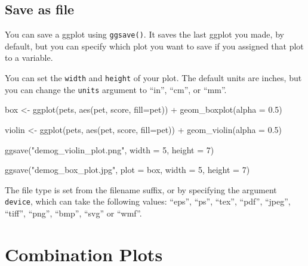 \documentclass[
  oneside]{book}
\newenvironment{Shaded}{\begin{snugshade}}{\end{snugshade}}
\newcommand{\AttributeTok}[1]{\textcolor[rgb]{0.77,0.63,0.00}{#1}}
\newcommand{\DecValTok}[1]{\textcolor[rgb]{0.00,0.00,0.81}{#1}}
\newcommand{\FloatTok}[1]{\textcolor[rgb]{0.00,0.00,0.81}{#1}}
\newcommand{\FunctionTok}[1]{\textcolor[rgb]{0.00,0.00,0.00}{#1}}
\newcommand{\NormalTok}[1]{#1}
\newcommand{\OtherTok}[1]{\textcolor[rgb]{0.56,0.35,0.01}{#1}}
\newcommand{\SpecialCharTok}[1]{\textcolor[rgb]{0.00,0.00,0.00}{#1}}
\newcommand{\StringTok}[1]{\textcolor[rgb]{0.31,0.60,0.02}{#1}}
\begin{document}
\hypertarget{ggsave}{%
\subsection{Save as file}\label{ggsave}}

You can save a ggplot using \texttt{ggsave()}. It saves the last ggplot you made, by default, but you can specify which plot you want to save if you assigned that plot to a variable.

You can set the \texttt{width} and \texttt{height} of your plot. The default units are inches, but you can change the \texttt{units} argument to ``in'', ``cm'', or ``mm''.

\begin{Shaded}
\begin{Highlighting}[]
\NormalTok{box }\OtherTok{\textless{}{-}} \FunctionTok{ggplot}\NormalTok{(pets, }\FunctionTok{aes}\NormalTok{(pet, score, }\AttributeTok{fill=}\NormalTok{pet)) }\SpecialCharTok{+}
  \FunctionTok{geom\_boxplot}\NormalTok{(}\AttributeTok{alpha =} \FloatTok{0.5}\NormalTok{)}

\NormalTok{violin }\OtherTok{\textless{}{-}} \FunctionTok{ggplot}\NormalTok{(pets, }\FunctionTok{aes}\NormalTok{(pet, score, }\AttributeTok{fill=}\NormalTok{pet)) }\SpecialCharTok{+}
  \FunctionTok{geom\_violin}\NormalTok{(}\AttributeTok{alpha =} \FloatTok{0.5}\NormalTok{)}

\FunctionTok{ggsave}\NormalTok{(}\StringTok{"demog\_violin\_plot.png"}\NormalTok{, }\AttributeTok{width =} \DecValTok{5}\NormalTok{, }\AttributeTok{height =} \DecValTok{7}\NormalTok{)}

\FunctionTok{ggsave}\NormalTok{(}\StringTok{"demog\_box\_plot.jpg"}\NormalTok{, }\AttributeTok{plot =}\NormalTok{ box, }\AttributeTok{width =} \DecValTok{5}\NormalTok{, }\AttributeTok{height =} \DecValTok{7}\NormalTok{)}
\end{Highlighting}
\end{Shaded}

\begin{info}
The file type is set from the filename suffix, or by
specifying the argument \texttt{device}, which can take the following values:
``eps'', ``ps'', ``tex'', ``pdf'', ``jpeg'', ``tiff'', ``png'', ``bmp'', ``svg'' or ``wmf''.

\end{info}

\hypertarget{combo_plots}{%
\section{Combination Plots}\label{combo_plots}}
\end{document}
